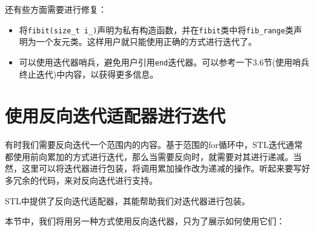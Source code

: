 还有些方面需要进行修复：

\begin{itemize}
\item 将\texttt{fibit(size\_t i\_)}声明为私有构造函数，并在\texttt{fibit}类中将\texttt{fib\_range}类声明为一个友元类。这样用户就只能使用正确的方式进行迭代了。

\item 可以使用迭代器哨兵，避免用户引用\texttt{end}迭代器。可以参考一下3.6节(使用哨兵终止迭代)中内容，以获得更多信息。

\end{itemize}


\section{使用反向迭代适配器进行迭代}

有时我们需要反向迭代一个范围内的内容。基于范围的for循环中，STL迭代通常都使用前向累加的方式进行迭代，那么当需要反向时，就需要对其进行递减。当然，这里可以将迭代器进行包装，将调用累加操作改为递减的操作。听起来要写好多冗余的代码，来对反向迭代进行支持。

STL中提供了反向迭代适配器，其能帮助我们对迭代器进行包装。


本节中，我们将用另一种方式使用反向迭代器，只为了展示如何使用它们：


